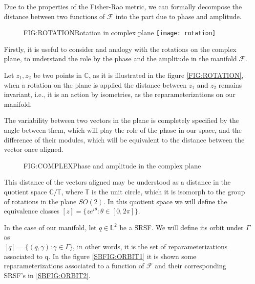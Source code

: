 
Due to the properties of the Fisher-Rao metric, we can formally decompose the distance
between two functions of $\mathcal{F}$ into the part due to phase and amplitude.

\begin{figure}[Rotation in complex plane]{FIG:ROTATION}{Rotation in complex plane}
	\texttt{[image: rotation]}
\end{figure}

Firstly, it is useful to consider and analogy with the rotations on the complex
plane, to understand the role by the phase and the amplitude in the manifold
$\mathcal{F}$.

Let $z_1, z_2$ be two points in $\mathbb{C}$, as it is illustrated in the
figure \ref{FIG:ROTATION}, when a rotation on the plane is applied the distance
between $z_1$ and $z_2$ remains invariant, i.e., it is an action by isometries, as the
reparameterizations on our manifold.

The variability between two vectors in the plane is completely specified by
the angle between them, which will play the role of the phase in our space, and
the difference of their modules, which will be equivalent to the distance
between the vector once aligned.

\begin{figure}[Phase and amplitude in the complex plane]{FIG:COMPLEX}{Phase and amplitude in the complex plane}

 \qquad
{}

\end{figure}


This distance of the vectors aligned may be understood as a distance in the
quotient space $\mathbb{C} / \mathbb{T}$, where $\mathbb{T}$ is the unit circle,
which it is isomorph to the group of rotations in the plane $SO(2)$. In this
quotient space we will define the equivalence classes
$[z] = \{z e^{i \theta} : \theta \in [0, 2\pi]\}$.

In the case of our manifold, let $q \in \mathbb{L}^2$ be a  \acs{SRSF}. We will define
its orbit under $\Gamma$ as \\$[q] = \{(q, \gamma) : \gamma \in \Gamma \}$, in
other words, it is the set of reparameterizations associated to q. In the
figure \ref{SBFIG:ORBIT1} it is shown some reparameterizations associated  to a function
of $\mathscr{F}$ and their corresponding SRSF's in \ref{SBFIG:ORBIT2}.


